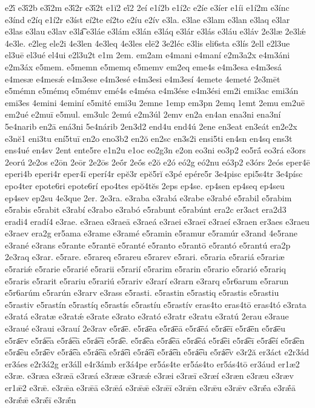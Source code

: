{e2ī́
e3ī́2b
e3ī́2m
e3ī́2r
e3ī́2t
e1ĭ2
eĭ́2
2eí
e1í2b
e1í2c
e2íe
e3íer
e1íi
e1í2m
e3ínc
e3índ
e2íq
e1í2r
e3íst
eí2te
eí2to
e2íu
e2ív
e3la.
e3lae
e3lam
e3lan
e3laq
e3lar
e3las
e3lau
e3lav
e3la͡
e3láe
e3lám
e3lán
e3láq
e3lár
e3lás
e3láu
e3láv
2e3læ
2e3lǽ
4e3le.
e2leg
ele2i
4e3len
4e3leq
4e3les
elē2
3e2léc
e3lis
eli6sta
e3lís
2ell
e2l3ue
el3uē
el3ué
el4ui
e2l3u2t
e1m
2em.
em2am
e4mani
e4maní
e2m3a2x
e4m3áni
e2m3áx
e5mem.
e5memn
e5memq
e5memv
em2eq
eme4s
e4m3esa
e4m3esá
e4mesæ
e4mesǽ
e4m3ese
e4m3esé
e4m3esi
e4m3esí
4emete
4emeté
2e3mēt
e5mémn
e5mémq
e5mémv
emé4s
e4mésa
e4m3ése
e4m3ési
em2i
emi3ac
emi3án
emi3es
4emini
4eminí
e5mité
emi3u
2emne
1emp
em3pn
2emq
1emt
2emu
em2uē
em2ué
e2muī
e5mul.
em3ulc
2emú
e2m3úl
2emv
en2a
en4an
ena3ni
ena3ní
5e4narib
en2ā
ená3ni
5e4nárib
2en3d2
end4u
end4ú
2ene
en3eat
en3eát
en2e2x
e3nĕ1
eni3tu
ení5tuī
en2o
eno3b2
en2ŏ
en2sc
en3s2i
ensi5ti
en4sn
en4sq
ens3t
ens4ué
en4sv
2ent
ente5re
e1n2u
e1oc
eo2g3n
e2on
eo3ni
eo3p2
eo5rā́
eo3rá
e3ors
2eorú
2e2os
e2ōn
2eōr
2e2ōs
2eṓr
2eṓs
e2ŏ
e2ó
eó2g
eó2nu
eó3p2
e3órs
2eós
eper4ē
eperi4b
eperi4r
eper4ī
eperí4r
epĕ3r
epĕ5rĭ
e3pé
epére5r
3e4pisc
epi5s4tr
3e4písc
epo4ter
epote6ri
epote6rí
epo4tes
epŏ4tĕs
2eps
ep4se.
ep4sen
ep4seq
ep4seu
ep4sev
ep2su
4e3que
2er.
2e3ra.
e3raba
e3rabá
e3rabe
e3rabé
e5rabil
e5rabim
e5rabis
e5rabit
e3rabí
e3rabo
e3rabó
e5rabunt
e5rabúnt
era2c
er3act
era2d3
eradi4
eradí4
e3rae.
e3raea
e3raeā
e3raeá
e3raei
e3raeī
e3raeí
e3raen
er3aes
e3raeu
e3raev
era2g
er5ama
e3rame
e3ramé
e5ramin
e5ramur
e5ramúr
e3rand
4e5rane
e3rané
e3rans
e5rante
e5rantē
e5ranté
e5ranto
e5rantō
e5rantó
e5rantú
era2p
2e3raq
e3rar.
e5rare.
e5rareq
e5rareu
e5rarev
e5rari.
e5raria
e5rariá
e5rariæ
e5rariǽ
e5rarie
e5rarié
e5rarii
e5rarií
e5rarim
e5rarin
e5rario
e5rarió
e5rariq
e5raris
e5rarit
e5rariu
e5rariú
e5rariv
e3rarí
e3rarn
e3rarq
e5r6arum
e5rarun
e5r6arúm
e5rarún
e3rarv
e3rass
e5rasti.
e5rastin
e5rastiq
e5rastis
e5rastiu
e5rastiv
e5rastín
e5rastíq
e5rastís
e5rastíu
e5rastív
eras4to
eras4tō
eras4tó
e3rata
e3ratá
e3ratæ
e3ratǽ
e3rate
e3rato
e3rató
e3ratr
e3ratu
e3ratú
2erau
e3raue
e3raué
e3raui
e3rauí
2e3rav
e5ra͞e.
e5ra͞ea
e5ra͞eā
e5ra͞eá
e5ra͞eī
e5ra͞en
e5ra͞eu
e5ra͞ev
e5rá͞ea
e5rá͞eā
e5rá͞eī
e5ra͡e.
e5ra͡ea
e5ra͡eā
e5ra͡eá
e5ra͡ei
e5ra͡eī
e5ra͡eí
e5ra͡en
e5ra͡eu
e5ra͡ev
e5rá͡ea
e5rá͡eā
e5rá͡ei
e5rá͡eī
e5rá͡en
e5rá͡eu
e5rá͡ev
e3r2ă
er3áct
e2r3ád
er3áes
e2r3á2g
er3áll
e4r3ámb
er3á4pe
er5ás4te
er5ás4to
er5ás4tō
er3áud
er1æ2
e3ræ.
e3ræa
e3ræā
e3ræá
e3rææ
e3ræǽ
e3ræi
e3ræī
e3ræí
e3ræn
e3ræu
e3ræv
er1ǣ2
e3rǣ.
e3rǣa
e3rǣā
e3rǣá
e3rǣǣ
e3rǣī
e3rǣn
e3rǣu
e3rǣv
e3rǣ́a
e3rǣ́ā
e3rǣ́ǣ
e3rǣ́ī
e3rǣ́n
}
